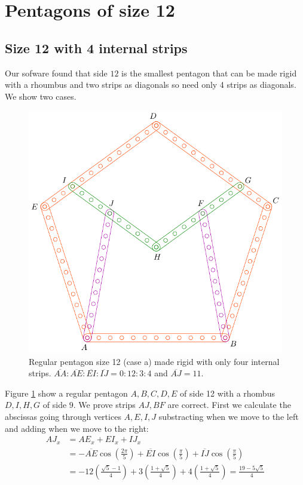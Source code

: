 \documentclass[11pt]{article}
\begin{document}

\section{Pentagons of size 12}

\subsection{Size 12 with 4 internal strips}

Our sofware found that side $12$ is the smallest pentagon that can be made rigid with a rhoumbus and two strips as diagonals so need only 4 strips as diagonals. We show two cases.

\begin{figure}[h]
 \centering
 \includegraphics[scale=0.8]{12/penta12a}
 \caption{Regular pentagon size 12 (case a) made rigid with only four internal strips. $\overline{AA}:\overline{AE}:\overline{EI}:\overline{IJ} = 0:12:3:4$ and $\overline{AJ}=11$.}
 \label{fig:penta12a}
\end{figure}

Figure \ref{fig:penta12a} show a regular pentagon $A,B,C,D,E$ of side 12 with a rhombus $D,I,H,G$ of side $9$. We prove strips $AJ,BF$ are correct. First we calculate the abscissas going through vertices $A,E,I,J$ substracting when we move to the left and adding when we move to the right:
\begin{align}
AJ_x &= AE_x + EI_x + IJ_x\nonumber\\
 &= -\overline{AE}\cos\left(\frac{2\pi}5\right)
 + \overline{EI}\cos\left(\frac{\pi}5\right) 
 + \overline{IJ}\cos\left(\frac{\pi}5\right)\nonumber\\
 &= -12\left(\frac{\sqrt5 - 1}4\right)
  +3\left(\frac{1+\sqrt5}4\right)
  +4\left(\frac{1+\sqrt5}4\right) 
  = \frac{19-5\sqrt5}4
\end{align}
\end{document}
